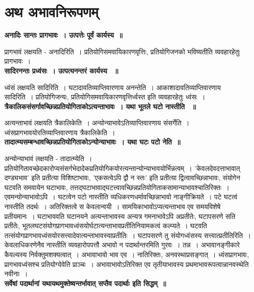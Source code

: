 \section*{अथ अभावनिरूपणम्}
{\bfseries अनादिः सान्तः प्रागभावः~। उत्पत्तेः पूर्वं कार्यस्य~॥}\par
	प्रागभावं लक्षयति - अनादिरिति~। प्रतियोगिसमवायिकारणवृत्तिः, प्रतियोगिजनको भविष्यतीति व्यवहारहेतुः प्रागभावः~।\\[10pt]
{\bfseries सादिरनन्तः प्रध्वंसः~। उत्पत्यनन्तरं कार्यस्य ~॥}\par
	ध्वंसं लक्षयति सादिरिति~। घटादावतिव्याप्तिवारणाय अनन्तेति~। आकाशादावतिव्याप्तिवारणाय सादिरिति~। प्रतियोगिजन्यः, प्रतियोगिसमवायिकारणवृत्तिर्ध्वस्त इति व्यवहारहेतुः ध्वंसः~।\\[10pt]
{\bfseries त्रैकालिकसंसर्गावच्छिन्नप्रतियोगिताकोऽत्यन्ताभावः~। यथा भूतले घटो नास्तीति ~॥}\par
	अत्यन्ताभावं लक्षयति त्रैकालिकेति~। अन्योन्याभावेऽतिव्याप्तिवारणाय संसर्गेति~। ध्वंसप्रागभावयोरतिव्याप्तिवारणाय त्रैकालिकेति~।\\[10pt]
{\bfseries तादात्म्यसम्बन्धावच्छिन्नप्रतियोगिताकोऽन्योन्याभावः~। यथा घटः पटो नेति~॥}\par
	अन्योन्याभावं लक्षयति - तादात्म्येति~। प्रतियोगितावच्छेदकारोप्यसंसर्गभेदादेकप्रतियोगिकयोरत्यन्तान्योन्याभावयोर्भिन्नत्वम्~। 'केवलदेवदत्ताभावात् दण्ड्यभाव' इति प्रतीत्या विशिष्टाभावः, ’एकसत्वेऽपि द्वौ न स्तः’ इति प्रतीत्या द्वित्वावच्छिन्नाभावः, संयोगेन घटवति समवायेन घटाभावः, तत्तद्घटाभावाद्घटत्त्वावच्छिन्नप्रतियोगिताकसामान्याभावश्चातिरिक्तः~। एवमन्योन्याभावोऽपि~। घटत्वेन पटो नास्तीति व्यधिकरणधर्मावच्छिन्नाभावो नाङ्गीक्रियते~। पटे घटत्वं नास्तीति तदर्थः~। अतिरिक्तत्वे स केवलान्वयी~। सामयिकाभावोऽप्यत्यन्ताभाव एव समयविशेषे प्रतीयमानः~। घटाभाववति घटानयने अत्यन्ताभावस्य अन्यत्र गमनाभावेऽपि अप्रतीतेः, घटापसरणे सति प्रतीतेः, भूतलघटसंयोगप्रागभावध्वंसयोर्घटात्यन्ताभावप्रतीतिनियामकत्वं कल्प्यते~। घटवति तत्संयोगप्रागभावध्वंसयोरसत्त्वादेवात्यन्ताभावस्याप्रतीतिः~। घटापसरणे तु संयोगध्वंसस्य सत्त्वात्प्रतीतिरिति~। केवलाधिकरणेनैव नास्तीति व्यवहारोपपत्तौ अभावो न पदार्थान्तरमिति गुरवः~। तन्न~। अभावानङ्गीकारे कैवल्यस्य निर्वक्तुमशक्यत्वात्~। अभावाभावो भाव एव~। नातिरिक्तः, अनवस्थाप्रसङ्गात्~। ध्वंसप्रागभावः, प्रागभावध्वंसश्च प्रतियोग्येवेति प्राञ्चः~। अभावाभावोऽतिरिक्त एव तृतीयाभावस्य प्रथमाभावरूपत्वान्नानवस्थेति नवीनाः~।\\[10pt]
{\bfseries सर्वेषां पदार्थानां यथायथमुक्तेष्वन्तर्भावात् सप्तैव पदार्थाः इति सिद्धम्~॥}\par
